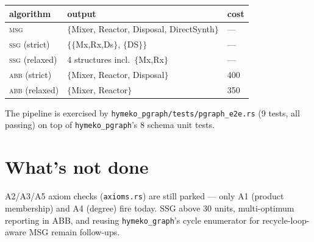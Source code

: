 \documentclass[11pt,a4paper]{article}
\newcommand{\code}[1]{\texttt{\small #1}}
\begin{document}
\begin{center}
\begin{tabular}{lll}
\toprule
algorithm                      & output                                   & cost \\
\midrule
\textsc{msg}                   & $\{$Mixer, Reactor, Disposal, DirectSynth$\}$ & --- \\
\textsc{ssg} (strict)          & $\{\{$Mx,Rx,Ds$\},\,\{$DS$\}\}$            & --- \\
\textsc{ssg} (relaxed)         & 4 structures incl.\ $\{$Mx,Rx$\}$          & --- \\
\textsc{abb} (strict)          & $\{$Mixer, Reactor, Disposal$\}$           & 400 \\
\textsc{abb} (relaxed)         & $\{$Mixer, Reactor$\}$                     & 350 \\
\bottomrule
\end{tabular}
\end{center}

The pipeline is exercised by \code{hymeko\_pgraph/tests/pgraph\_e2e.rs}
(9 tests, all passing) on top of \code{hymeko\_pgraph}'s 8 schema
unit tests.

\section*{What's not done}

A2/A3/A5 axiom checks (\code{axioms.rs}) are still parked --- only
A1 (product membership) and A4 (degree) fire today. SSG above 30
units, multi-optimum reporting in ABB, and reusing
\code{hymeko\_graph}'s cycle enumerator for recycle-loop-aware MSG
remain follow-ups.
\end{document}

